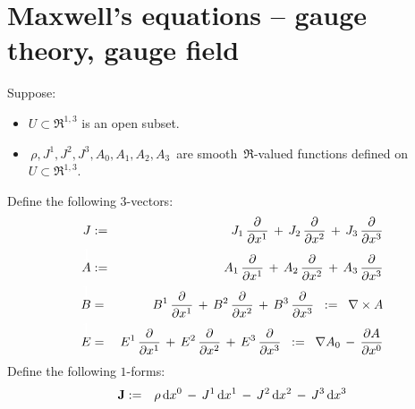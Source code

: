 

\section{Maxwell's equations -- gauge theory, gauge field}
\setcounter{theorem}{0}
\setcounter{equation}{0}

\renewcommand{\theenumi}{\roman{enumi}}
\renewcommand{\labelenumi}{\textnormal{(\theenumi)}$\;\;$}


\begin{theorem}
\mbox{}
\vskip 0.2cm
\noindent
Suppose:
\begin{itemize}
\item
	$U \subset \Re^{1,3}$ is an open subset.
\item
	\,$\rho, J^{1}, J^{2}, J^{3}, A_{0}, A_{1}, A_{2}, A_{3}$\,
	are smooth \,$\Re$-valued functions defined on $U \subset \Re^{1,3}$.
\end{itemize}
\vskip 0.3cm
\noindent
Define the following $3$-vectors:
\begin{eqnarray*}
J
& := &
	J_{1}\,\dfrac{\partial}{\partial x^{1}} \,+\, J_{2}\,\dfrac{\partial}{\partial x^{2}} \,+\, J_{3}\,\dfrac{\partial}{\partial x^{3}}
\\
\overset{{\color{white}\textnormal{\Large$1$}}}{A}
& := &
	A_{1}\,\dfrac{\partial}{\partial x^{1}} \,+\, A_{2}\,\dfrac{\partial}{\partial x^{2}} \,+\, A_{3}\,\dfrac{\partial}{\partial x^{3}}
\\
\overset{{\color{white}\textnormal{\Large$1$}}}{B}
& = &
	B^{1}\,\dfrac{\partial}{\partial x^{1}} \,+\, B^{2}\,\dfrac{\partial}{\partial x^{2}} \,+\, B^{3}\,\dfrac{\partial}{\partial x^{3}}
\;\; := \;\;
	\nabla \times A
\\
\overset{{\color{white}\textnormal{\Large$1$}}}{E}
& = &
	E^{1}\,\dfrac{\partial}{\partial x^{1}} \,+\, E^{2}\,\dfrac{\partial}{\partial x^{2}} \,+\, E^{3}\,\dfrac{\partial}{\partial x^{3}}
\;\; := \;\;
	\nabla A_{0} \,-\, \dfrac{\partial A}{\partial x^{0}}
\end{eqnarray*}
\vskip 0.3cm
\noindent
Define the following $1$-forms:
\begin{eqnarray*}
\mathbf{J}
& := &
	\rho \, \d x^{0} \,-\, J^{1}\,\d x^{1} \,-\, J^{2}\,\d x^{2} \,-\, J^{3}\,\d x^{3}

\end{eqnarray*}
\end{theorem}
